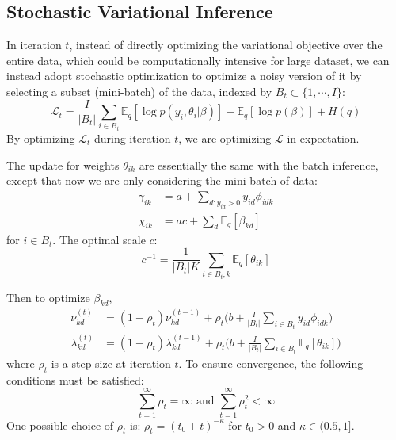 \documentclass[10pt]{article} %
\begin{document}
\subsection{Stochastic Variational Inference}

In iteration $t$, instead of directly optimizing the variational objective over the entire data, which could be computationally intensive for large dataset, we can instead adopt stochastic optimization to optimize a noisy version of it by selecting a subset (mini-batch) of the data, indexed by $B_t \subset \{1, \cdots, I\}$:
\[
\mathcal{L}_t = \frac{I}{|B_t|}\sum_{i \in B_t} \mathbb{E}_q[\log p(y_i , \theta_i | \beta)]  + \mathbb{E}_q[\log p(\beta)] + H(q)
\]
By optimizing $\mathcal{L}_t$ during iteration $t$, we are optimizing $\mathcal{L}$ in expectation. 

The update for weights $\theta_{ik}$ are essentially the same with the batch inference, except that now we are only considering the mini-batch of data:
\begin{align*}
\gamma_{ik} &= a + \sum_{d: y_{id} > 0} y_{id} \phi_{idk}\\
\chi_{ik} &= ac + \sum_d \mathbb{E}_q[\beta_{kd}]
\end{align*}
for $i \in B_t$. The optimal scale $c$:
\[
c^{-1} = \frac{1}{|B_t| K}\sum_{i \in B_t, k} \mathbb{E}_q [\theta_{ik}]
\]

Then to optimize $\beta_{kd}$, 
\begin{align*}
\nu_{kd}^{(t)} &= (1 - \rho_t) \nu_{kd}^{(t-1)} + \rho_t \biggl(b +  \frac{I}{|B_t|}\sum_{i \in B_t} y_{id} \phi_{idk}\biggl)\\
\lambda_{kd}^{(t)} &= (1 - \rho_t) \lambda_{kd}^{(t-1)} + \rho_t \biggl( b +  \frac{I}{|B_t|}\sum_{i \in B_t} \mathbb{E}_q[\theta_{ik}]\biggl)
\end{align*}
where $\rho_t$ is a step size at iteration $t$. To ensure convergence, the following conditions must be satisfied:
\[
\sum_{t=1}^\infty\rho_t = \infty  \text{ and } \sum_{t=1}^\infty \rho_t^2 < \infty
\]
One possible choice of $\rho_t$ is: $\rho_t = (t_0 + t)^{-\kappa}$ for $t_0 > 0$ and $\kappa \in (0.5, 1]$. 
\end{document}
